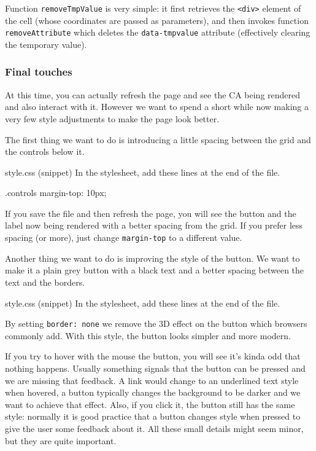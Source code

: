 Function \texttt{removeTmpValue} is very simple: it first retrieves the \texttt{<div>} element of the cell
(whose coordinates are passed as parameters), and then invokes function \texttt{removeAttribute} which
deletes the \texttt{data-tmpvalue} attribute (effectively clearing the temporary value).

\subsubsection{Final touches}
At this time, you can actually refresh the page and see the CA being rendered and also interact with it.
However we want to spend a short while now making a very few style adjustments to make the page look better.

The first thing we want to do is introducing a little spacing between the grid and the controls below it.

\begin{programcode}{style.css (snippet)}
In the stylesheet, add these lines at the end of the file.
\begin{codecss}
.controls {
  margin-top: 10px;
}
\end{codecss}
\end{programcode}

If you save the file and then refresh the page, you will see
the button and the label now being rendered with a better
spacing from the grid. If you prefer less spacing (or more), just change \texttt{margin-top} to a different
value.

Another thing we want to do is improving the style of the button. We want to make it a plain grey button
with a black text and a better spacing between the text and the borders.

\begin{programcode}{style.css (snippet)}
In the stylesheet, add these lines at the end of the file.
\end{programcode}

By setting \texttt{border: none} we remove the 3D effect on the button which browsers commonly add.
With this style, the button looks simpler and more modern.

If you try to hover with the mouse the button, you will see it's kinda odd that nothing happens. Usually
something signals that the button can be pressed and we are missing that feedback. A link would change to
an underlined text style when hovered, a button typically changes the background to be darker and we want to
achieve that effect. Also, if you click it, the button still has the same style: normally it is good
practice that a button changes style when pressed to give the user some feedback about it. All these
small details might seem minor, but they are quite important.

